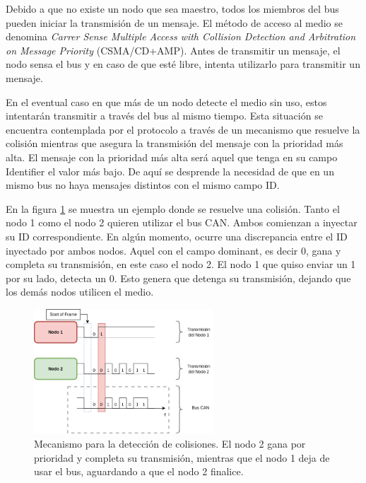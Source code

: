 

Debido a que no existe un nodo que sea maestro, todos los miembros del bus pueden iniciar la transmisión de un mensaje. El método de acceso al medio se denomina \textit{Carrer Sense Multiple Access with Collision Detection and Arbitration on Message Priority} (CSMA/CD+AMP). Antes de transmitir un mensaje, el nodo sensa el bus y en caso de que esté libre, intenta utilizarlo para transmitir un mensaje.


En el eventual caso en que más de un nodo detecte el medio sin uso, estos intentarán transmitir a través del bus al mismo tiempo. Esta situación se encuentra contemplada por el protocolo a través de un mecanismo que resuelve la colisión mientras que asegura la transmisión del mensaje con la prioridad más alta. El mensaje con la prioridad más alta será aquel que tenga en su campo Identifier el valor más bajo. De aquí se desprende la necesidad de que en un mismo bus no haya mensajes distintos con el mismo campo ID.

En la figura \ref{fig:CAN_arbitration} se muestra un ejemplo donde se resuelve una colisión. Tanto el nodo 1 como el nodo 2 quieren utilizar el bus CAN. Ambos comienzan a inyectar su ID correspondiente. En algún momento, ocurre una discrepancia entre el ID inyectado por ambos nodos. Aquel con el campo dominant, es decir 0, gana y completa su transmisión, en este caso el nodo 2. El nodo 1 que quiso enviar un 1 por su lado, detecta un 0. Esto genera que detenga su transmisión, dejando que los demás nodos utilicen el medio.

\begin{figure}[htb]
    \centering
    \includegraphics[width=0.6\textwidth]{img/CAN_arbitration.png}
    \caption{Mecanismo para la detección de colisiones. El nodo 2 gana por prioridad y completa su transmisión, mientras que el nodo 1 deja de usar el bus, aguardando a que el nodo 2 finalice.}
    \label{fig:CAN_arbitration}
\end{figure}

